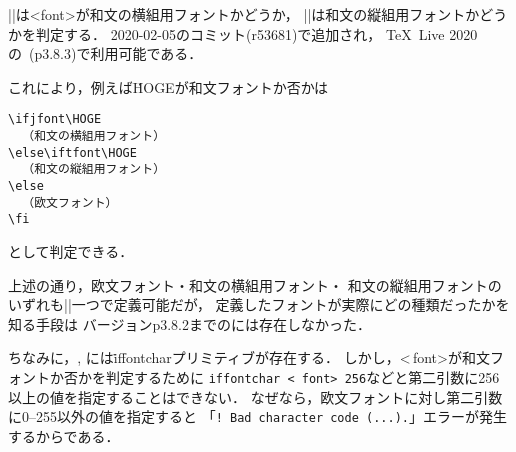 \documentclass[a4paper,11pt,nomag,dvipdfmx]{jsarticle}
\begin{document}
\begin{cslist}
  |\ifjfont|は<font>が和文の横組用フォントかどうか，
  |\iftfont|は和文の縦組用フォントかどうかを判定する．
  2020-02-05のコミット(r53681)で追加され，
  \TeX~Live 2020の\pTeX~(p3.8.3)で利用可能である．

  これにより，例えば\.{HOGE}が和文フォントか否かは
\begin{verbatim}
\ifjfont\HOGE
  （和文の横組用フォント）
\else\iftfont\HOGE
  （和文の縦組用フォント）
\else
  （欧文フォント）
\fi
\end{verbatim}
  として判定できる．
\end{cslist}

\begin{dangerous}
  上述の通り，欧文フォント・和文の横組用フォント・
  和文の縦組用フォントのいずれも|\font|一つで定義可能だが，
  定義したフォントが実際にどの種類だったかを知る手段は
  バージョンp3.8.2までの\pTeX には存在しなかった．
\end{dangerous}

\begin{dangerous}
  ちなみに，\epTeX, \eupTeX には\.{iffontchar}プリミティブが存在する．
  しかし，<\,font>が和文フォントか否かを判定するために
  \texttt{\.{iffontchar}~<\,font>~256}などと第二引数に256以上の値を指定することはできない．
  なぜなら，欧文フォントに対し第二引数に0--255以外の値を指定すると
  「\verb+! Bad character code (...).+」エラーが発生するからである．
\end{dangerous}
\end{document}
